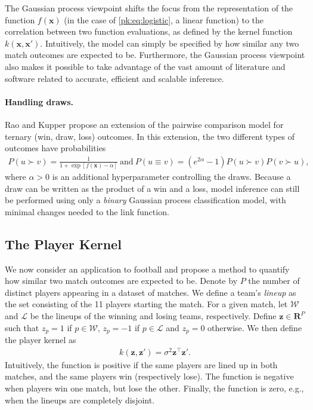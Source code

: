 The Gaussian process viewpoint shifts the focus from the representation of the function $f(\bm{x})$ (in the case of \eqref{pk:eq:logistic}, a linear function) to the correlation between two function evaluations, as defined by the kernel function $k(\bm{x}, \bm{x}')$.
Intuitively, the model can simply be specified by how similar any two match outcomes are expected to be.
Furthermore, the Gaussian process viewpoint also makes it possible to take advantage of the vast amount of literature and software related to accurate, efficient and scalable inference.


\paragraph{Handling draws.}
Rao and Kupper \cite{rao1967ties} propose an extension of the pairwise comparison model for ternary (win, draw, loss) outcomes.
In this extension, the two different types of outcomes have probabilities
\begin{align*}
P(u \succ v) = \frac{1}{1 + \exp[f(\bm{x}) - \alpha]}\ \text{and}\ 
P(u \equiv v) = (e^{2 \alpha} - 1) P(u \succ v) P(v \succ u),
\end{align*}
where $\alpha > 0$ is an additional hyperparameter controlling the draws.
Because a draw can be written as the product of a win and a loss, model inference can still be performed using only a \emph{binary} Gaussian process classification model, with minimal changes needed to the link function.


\subsection{The Player Kernel}

We now consider an application to football and propose a method to quantify how similar two match outcomes are expected to be.
Denote by $P$ the number of distinct players appearing in a dataset of matches.
We define a team's \emph{lineup} as the set consisting of the \num{11} players starting the match.
For a given match, let $\mathcal{W}$ and $\mathcal{L}$ be the lineups of the winning and losing teams, respectively.
Define $\bm{z} \in \mathbf{R}^P$ such that $z_p = 1$ if $p \in \mathcal{W}$, $z_p = -1$ if $p \in \mathcal{L}$ and $z_p = 0$ otherwise.
We then define the player kernel as
\begin{align*}
k(\bm{z}, \bm{z}') = \sigma^2 \bm{z}^\top \bm{z}'.
\end{align*}
Intuitively, the function is positive if the same players are lined up in both matches, and the same players win (respectively lose).
The function is negative when players win one match, but lose the other.
Finally, the function is zero, e.g., when the lineups are completely disjoint.

